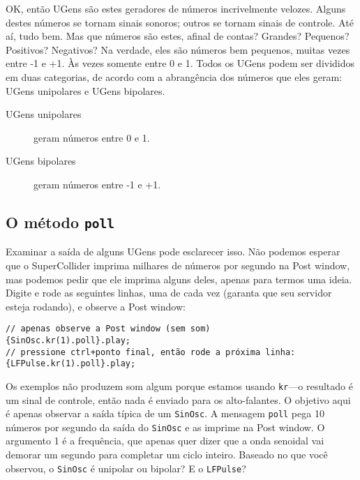 OK, então UGens são estes geradores de números incrivelmente velozes. Alguns destes números se tornam sinais sonoros; outros se tornam sinais de controle. Até aí, tudo bem. Mas que números são estes, afinal de contas? Grandes? Pequenos? Positivos? Negativos? Na verdade, eles são números bem pequenos, muitas vezes entre -1 e +1. Às vezes somente entre 0 e 1. Todos os UGens podem ser divididos em duas categorias, de acordo com a abrangência dos números que eles geram: UGens unipolares e UGens bipolares.

\begin{description}
\item[UGens unipolares] geram números entre 0 e 1.
\item[UGens bipolares] geram números entre -1 e +1.

\end{description}

\subsection{O método \texttt{poll}}

Examinar a saída de alguns UGens pode esclarecer isso. Não podemos esperar que o SuperCollider imprima milhares de números por segundo na Post window, mas podemos pedir que ele imprima alguns deles, apenas para termos uma ideia. Digite e rode as seguintes linhas, uma de cada vez (garanta que seu servidor esteja rodando), e observe a Post window: 

\begin{lstlisting}[style=SuperCollider-IDE, basicstyle=\scttfamily\footnotesize]
// apenas observe a Post window (sem som)
{SinOsc.kr(1).poll}.play;
// pressione ctrl+ponto final, então rode a próxima linha:
{LFPulse.kr(1).poll}.play;
\end{lstlisting}

Os exemplos não produzem som algum porque estamos usando \texttt{kr}---o resultado é um sinal de controle, então nada é enviado para os alto-falantes. O objetivo aqui é apenas observar a saída típica de um \texttt{SinOsc}. A mensagem \texttt{poll} pega 10 números por segundo da saída do \texttt{SinOsc} e as imprime na Post window. O argumento 1 é a frequência, que apenas quer dizer que a onda senoidal vai demorar um segundo para completar um ciclo inteiro. Baseado no que você observou, o \texttt{SinOsc} é unipolar ou bipolar? E o \texttt{LFPulse}?

